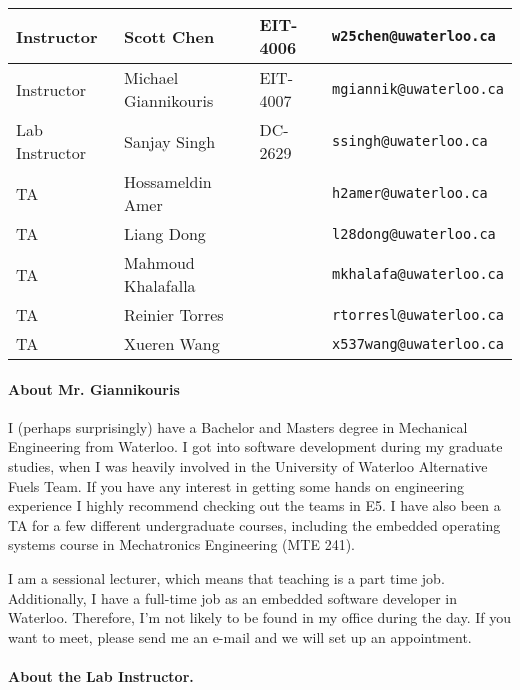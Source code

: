\documentclass[letterpaper,10pt]{article}
\begin{document}
\begin{table}[h]
        \begin{center}
        \begin{tabular}{l|l|l|l}
        Instructor & Scott Chen & EIT-4006 & \texttt{w25chen@uwaterloo.ca} \\
        \hline
        Instructor & Michael Giannikouris & EIT-4007 & \texttt{mgiannik@uwaterloo.ca} \\
        \hline
        Lab Instructor & Sanjay Singh & DC-2629 & \texttt{ssingh@uwaterloo.ca}\\
        \hline
        TA & Hossameldin Amer &  & \texttt{h2amer@uwaterloo.ca} \\
        TA & Liang Dong &  & \texttt{l28dong@uwaterloo.ca} \\
        TA & Mahmoud Khalafalla &  & \texttt{mkhalafa@uwaterloo.ca} \\
        TA & Reinier Torres & & \texttt{rtorresl@uwaterloo.ca} \\
        TA & Xueren Wang & & \texttt{x537wang@uwaterloo.ca} \\
        \end{tabular}
        \end{center}
\end{table}

\paragraph{About Mr. Giannikouris}
I (perhaps surprisingly) have a Bachelor and Masters degree in Mechanical Engineering from Waterloo. I got into software development during my graduate studies, when I was heavily involved in the University of Waterloo Alternative Fuels Team. If you have any interest in getting some hands on engineering experience I highly recommend checking out the teams in E5. I have also been a TA for a few different undergraduate courses, including the embedded operating systems course in Mechatronics Engineering (MTE 241).

I am a sessional lecturer, which means that teaching is a part time job. Additionally, I have a full-time job as an embedded software developer in Waterloo. Therefore, I'm not likely to be found in my office during the day. If you want to meet, please send me an e-mail and we will set up an appointment.

\paragraph{About the Lab Instructor.}
\end{document}
